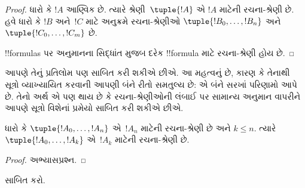 \documentclass[../../../include/open-logic-section]{subfiles}
\begin{document}
\begin{proof}
ધારો કે $!A$ આણ્વિક છે. ત્યારે શ્રેણી~$\tuple{!A}$ એ $!A$ માટેની
રચના-શ્રેણી છે.
%
હવે ધારો કે $!B$ અને~$!C$ માટે અનુક્રમે રચના-શ્રેણીઓ
$\tuple{!B_0,\dotsc,!B_n}$ અને $\tuple{!C_0,\dotsc,!C_m}$ છે.
%
\begin{enumerate}
\end{enumerate}
!!{formula}s પર અનુમાનના સિદ્ધાંત મુજબ દરેક !!{formula} માટે
રચના-શ્રેણી હોય છે.
\end{proof}

આપણે તેનું પ્રતિલોમ પણ સાબિત કરી શકીએ છીએ. આ મહત્વનું છે, કારણ કે
તેનાથી સૂત્રો વ્યાખ્યાયિત કરવાની આપણી બંને રીતો સમતુલ્ય છે: એ બંને
સરખાં પરિણામો આપે છે. તેનો અર્થ એ પણ થાય છે કે રચના-શ્રેણીઓની લંબાઈ
પર સામાન્ય અનુમાન વાપરીને આપણે સૂત્રો વિશેનાં પ્રમેયો સાબિત કરી
શકીએ છીએ.

\begin{lem}
ધારો કે $\tuple{!A_0,\dotsc,!A_n}$ એ~$!A_n$ માટેની રચના-શ્રેણી છે
અને $k \leq n$. ત્યારે $\tuple{!A_0,\dotsc,!A_k}$ એ~$!A_k$ માટેની
રચના-શ્રેણી છે.
\end{lem}

\begin{proof}
અભ્યાસપ્રશ્ન.
\end{proof}

\begin{prob}
 સાબિત કરો.
\end{prob}
\end{document}
